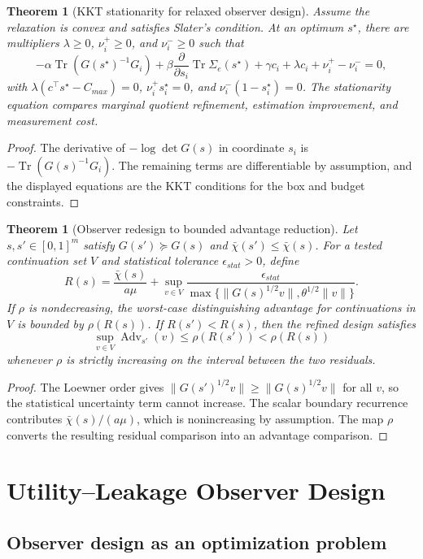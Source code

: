 \documentclass[11pt]{article}
\theoremstyle{definition}
\theoremstyle{plain}
\newtheorem{theorem}[definition]{Theorem}
\theoremstyle{remark}
\DeclareMathOperator{\Tr}{Tr}
\newcommand{\Adv}{\operatorname{Adv}}
\begin{document}
\begin{theorem}[KKT stationarity for relaxed observer design]
Assume the relaxation is convex and satisfies Slater's condition. At an optimum $s^\star$, there are multipliers $\lambda\ge0$, $\nu_i^+\ge0$, and $\nu_i^-\ge0$ such that
\[
-\alpha\Tr(G(s^\star)^{-1}G_i)
+\beta\frac{\partial}{\partial s_i}\Tr\Sigma_e(s^\star)
+\gamma c_i+\lambda c_i+\nu_i^+-\nu_i^-=0,
\]
with $\lambda(c^\top s^\star-C_{max})=0$, $\nu_i^+s_i^\star=0$, and $\nu_i^-(1-s_i^\star)=0$. The stationarity equation compares marginal quotient refinement, estimation improvement, and measurement cost.
\end{theorem}

\begin{proof}
The derivative of $-\log\det G(s)$ in coordinate $s_i$ is $-\Tr(G(s)^{-1}G_i)$. The remaining terms are differentiable by assumption, and the displayed equations are the KKT conditions for the box and budget constraints.
\end{proof}

\begin{theorem}[Observer redesign to bounded advantage reduction]
Let $s,s'\in[0,1]^m$ satisfy $G(s')\succeq G(s)$ and $\bar\chi(s')\le\bar\chi(s)$. For a tested continuation set $V$ and statistical tolerance $\epsilon_{stat}>0$, define
\[
R(s)=\frac{\bar\chi(s)}{a\mu}
+\sup_{v\in V}\frac{\epsilon_{stat}}{\max\{\|G(s)^{1/2}v\|,\theta^{1/2}\|v\|\}}.
\]
If $\rho$ is nondecreasing, the worst-case distinguishing advantage for continuations in $V$ is bounded by $\rho(R(s))$. If $R(s')<R(s)$, then the refined design satisfies
\[
    \sup_{v\in V}\Adv_{s'}(v)\le \rho(R(s'))<\rho(R(s))
\]
whenever $\rho$ is strictly increasing on the interval between the two residuals.
\end{theorem}

\begin{proof}
The Loewner order gives $\|G(s')^{1/2}v\|\ge\|G(s)^{1/2}v\|$ for all $v$, so the statistical uncertainty term cannot increase. The scalar boundary recurrence contributes $\bar\chi(s)/(a\mu)$, which is nonincreasing by assumption. The map $\rho$ converts the resulting residual comparison into an advantage comparison.
\end{proof}

\section{Utility--Leakage Observer Design}

\subsection{Observer design as an optimization problem}
\end{document}
